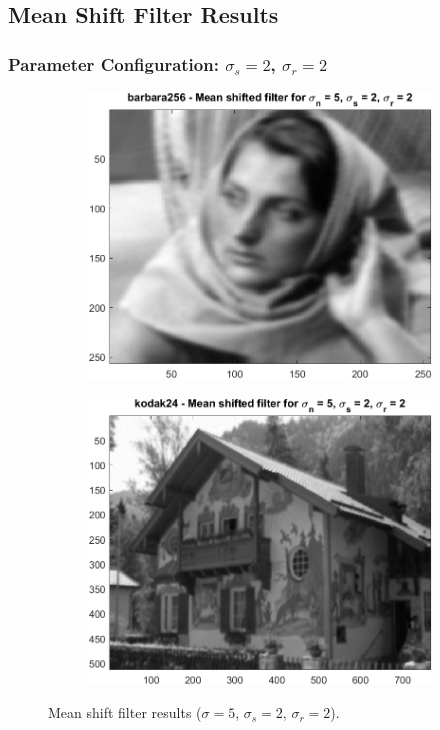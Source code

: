 \documentclass{article}
\begin{document}
\subsection{Mean Shift Filter Results}
\subsubsection{\texorpdfstring{Parameter Configuration: $\sigma_s = 2$, $\sigma_r = 2$}{Parameter Configuration: sigma\_s = 2, sigma\_r = 2}}
\begin{figure}[H]
    \centering
    \begin{subfigure}[b]{0.45\textwidth}
        \includegraphics[width=\textwidth]{../images/barbara_5_2_2.png}
    \end{subfigure}
    \begin{subfigure}[b]{0.45\textwidth}
        \includegraphics[width=\textwidth]{../images/kodak_5_2_2.png}
    \end{subfigure}
    \caption{Mean shift filter results ($\sigma = 5$, $\sigma_s = 2$, $\sigma_r = 2$).}
\end{figure}
\end{document}
